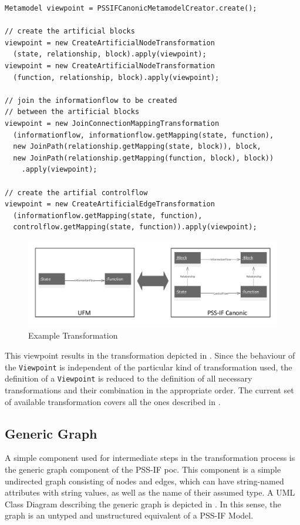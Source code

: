 \begin{verbatim}
Metamodel viewpoint = PSSIFCanonicMetamodelCreator.create();

// create the artificial blocks
viewpoint = new CreateArtificialNodeTransformation
  (state, relationship, block).apply(viewpoint);
viewpoint = new CreateArtificialNodeTransformation
  (function, relationship, block).apply(viewpoint);

// join the informationflow to be created
// between the artificial blocks
viewpoint = new JoinConnectionMappingTransformation
  (informationflow, informationflow.getMapping(state, function),
  new JoinPath(relationship.getMapping(state, block)), block,
  new JoinPath(relationship.getMapping(function, block), block))
    .apply(viewpoint);

// create the artifial controlflow
viewpoint = new CreateArtificialEdgeTransformation
  (informationflow.getMapping(state, function), 
  controlflow.getMapping(state, function)).apply(viewpoint);
\end{verbatim}

\begin{figure}
\centering
\includegraphics[width=\textwidth]{figures/transformation.pdf}
\caption{Example Transformation}
\label{fig:transformation}
\end{figure}

This viewpoint results in the transformation depicted in . Since the behaviour of the \texttt{Viewpoint} is independent of the particular kind of transformation used, the definition of a \texttt{Viewpoint} is reduced to the definition of all necessary transformations and their combination in the appropriate order. The current set of available transformation covers all the ones described in .

\subsection{Generic Graph}

A simple component used for intermediate steps in the transformation process is the generic graph component of the PSS-IF \gls{poc}. This component is a simple undirected graph consisting of nodes and edges, which can have string-named attributes with string values, as well as the name of their assumed type. A UML Class Diagram describing the generic graph is depicted in . In this sense, the graph is an untyped and unstructured equivalent of a PSS-IF Model.

